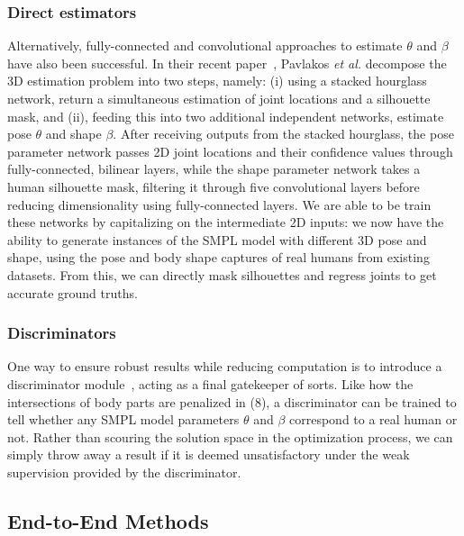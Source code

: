 \documentclass[9pt,twocolumn]{article}
\begin{document}
{		\subsubsection{Direct estimators}

			\par{Alternatively, fully-connected and convolutional approaches to estimate $\theta$ and $\beta$ have also been successful.
			In their recent paper~\cite{humanshape}, Pavlakos \textit{et al.} decompose the 3D estimation problem into two steps, namely: (i) using a
			stacked hourglass network, return a simultaneous estimation of joint locations and a silhouette mask, and (ii), feeding this into two additional
			independent networks, estimate pose $\theta$ and shape $\beta$. After receiving outputs from the stacked hourglass, the pose parameter
			network passes 2D joint locations and their confidence values through fully-connected, bilinear layers, while the shape parameter network takes
			a human silhouette mask, filtering it through five convolutional layers before reducing dimensionality using fully-connected layers. We are
			able to be train these networks by capitalizing on the intermediate 2D inputs: we now have the ability to generate instances of the SMPL model
			with different 3D pose and shape, using the pose and body shape captures of real humans from existing datasets. From this, we can directly
			mask silhouettes and regress joints to get accurate ground truths.}


		\subsubsection{Discriminators}

			\par{One way to ensure robust results while reducing computation is to introduce a discriminator module~\cite{hmr}, acting as a final gatekeeper
			of sorts. Like how the intersections of body parts are penalized in (8), a discriminator can be trained to tell whether any SMPL model
			parameters $\theta$ and $\beta$ correspond to a real human or not. Rather than scouring the solution space in the optimization process, we can
			simply throw away a result if it is deemed unsatisfactory under the weak supervision provided by the discriminator.}

	\subsection{End-to-End Methods}

}
\end{document}
